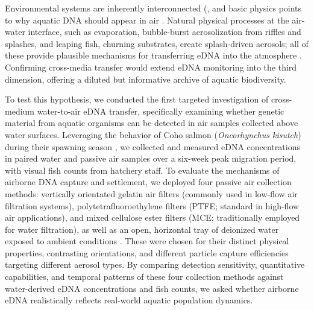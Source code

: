 \documentclass{article}
\begin{document}
Environmental systems are inherently interconnected (\cite{folke2021}, and basic physics points to why aquatic DNA should appear in air \cite{monahan1986, seinfeld2016}. Natural physical processes at the air-water interface, such as evaporation, bubble-burst aerosolization from riffles and splashes, and leaping fish, churning substrates, create splash-driven aerosols; all of these provide plausible mechanisms for transferring eDNA into the atmosphere \cite{duchemin2002, mueller2008, stell2020, vandijk2003}. Confirming cross-media transfer would extend eDNA monitoring into the third dimension, offering a diluted but informative archive of aquatic biodiversity.

To test this hypothesis, we conducted the first targeted investigation of cross-medium water-to-air eDNA transfer, specifically examining whether genetic material from aquatic organisms can be detected in air samples collected above water surfaces. Leveraging the behavior of Coho salmon (\textit{Oncorhynchus kisutch}) during their spawning season \cite{mueller2008}, we collected and measured eDNA concentrations in paired water and passive air samples over a six-week peak migration period, with visual fish counts from hatchery staff. To evaluate the mechanisms of airborne DNA capture and settlement, we deployed four passive air collection methods: vertically orientated gelatin air filters (commonly used in low-flow air filtration systems), polytetrafluoroethylene filters (PTFE; standard in high-flow air applications), and mixed cellulose ester filters (MCE; traditionally employed for water filtration), as well as an open, horizontal tray of deionized water exposed to ambient conditions \cite{klepke2022}. These were chosen for their distinct physical properties, contrasting orientations, and different particle capture efficiencies targeting different aerosol types. By comparing detection sensitivity, quantitative capabilities, and temporal patterns of these four collection methods against water-derived eDNA concentrations and fish counts, we asked whether airborne eDNA realistically reflects real-world aquatic population dynamics.
\end{document}
